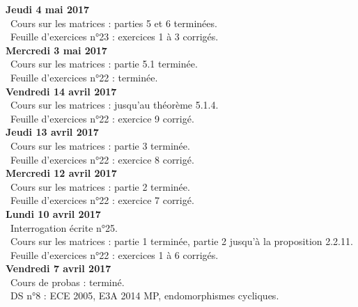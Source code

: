 \documentclass[12pt,a4paper]{article}
\begin{document}
\noindent\textbf{Jeudi 4 mai 2017}\\
\bu\ Cours sur les matrices : parties 5 et 6 terminées.\\
\bu\ Feuille d'exercices n°23 : exercices 1 à 3 corrigés.\vspace{.4cm}\\

\noindent\textbf{Mercredi 3 mai 2017}\\
\bu\ Cours sur les matrices : partie 5.1 terminée.\\
\bu\ Feuille d'exercices n°22 : terminée.\vspace{.4cm}\\

\noindent\textbf{Vendredi 14 avril 2017}\\
\bu\ Cours sur les matrices : jusqu'au théorème 5.1.4.\\
\bu\ Feuille d'exercices n°22 : exercice 9 corrigé.\vspace{.4cm}\\

\noindent\textbf{Jeudi 13 avril 2017}\\
\bu\ Cours sur les matrices : partie 3 terminée.\\
\bu\ Feuille d'exercices n°22 : exercice 8 corrigé.\vspace{.4cm}\\

\noindent\textbf{Mercredi 12 avril 2017}\\
\bu\ Cours sur les matrices : partie 2 terminée.\\
\bu\ Feuille d'exercices n°22 : exercice 7 corrigé.\vspace{.4cm}\\

\noindent\textbf{Lundi 10 avril 2017}\\
\bu\ Interrogation écrite n°25.\\
\bu\ Cours sur les matrices : partie 1 terminée, partie 2 jusqu'à la proposition 2.2.11.\\
\bu\ Feuille d'exercices n°22 : exercices 1 à 6 corrigés.\vspace{.4cm}\\

\noindent\textbf{Vendredi 7 avril 2017}\\
\bu\ Cours de probas : terminé.\\
\bu\ DS n°8 : ECE 2005, E3A 2014 MP, endomorphismes cycliques.\vspace{.4cm}\\
\end{document}
